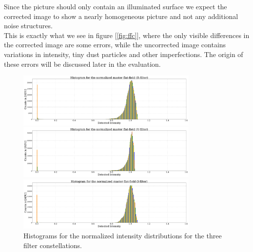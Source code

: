 Since the picture should only contain an illuminated surface we expect the corrected image to show a nearly homogeneous picture and not any additional noise structures. \\
This is exactly what we see in figure [\ref{fig:ffc}], where the only visible differences in the corrected image are some errors, 
while the uncorrected image contains variations in intensity, tiny dust particles and other imperfections. 
The origin of these errors will be discussed later in the evaluation.\\

\begin{figure}[H]
	
	\begin{minipage}{\textwidth}
		\centering
		\includegraphics[width = 0.8\textwidth]{figures/Plots/histR}
	\end{minipage}
	\begin{minipage}{\textwidth}
		\centering
		\includegraphics[width = 0.8\textwidth]{figures/Plots/histV}
	\end{minipage}
	\begin{minipage}{\textwidth}
		\centering
		\includegraphics[width = 0.8\textwidth]{figures/Plots/histI}
	\end{minipage}
	\caption{Histograms for the normalized intensity distributions for the three filter constellations.}
	\label{fig:histograms}
\end{figure} 

